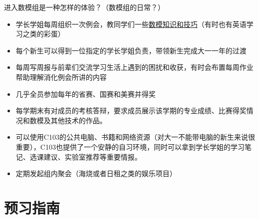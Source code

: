 \documentclass[xcolor={usenames,dvipsnames}]{beamer}
\begin{document}
\begin{frame}
\begin{block}{进入数模组是一种怎样的体验？（数模组的日常？）}
\begin{itemize}
   \item 学长学姐每周组织一次例会，教同学们一些\hyperlink{content}{数模知识和技巧}（有时也有英语学习之类的彩蛋）
   \item 每个新生可以得到一位指定的学长学姐负责，带领新生完成大一一年的过渡
   \item 每周写周报与前辈们交流学习生活上遇到的困扰和收获，有时会布置每周作业帮助理解消化例会所讲的内容
   \item 几乎全员参加每年的省赛、国赛和美赛并得奖
   \item 每学期末有对成员的考核答辩，要求成员展示该学期的专业成绩、比赛得奖情况和数模及其他技术的作品。
   \item 可以使用C103的公共电脑、书籍和网络资源（对大一不能带电脑的新生来说很重要），C103也提供了一个安静的自习环境，同时可以拿到学长学姐的学习笔记、选课建议、实验室推荐等重要情报。
   \item 定期发起组内聚会（海烧或者日租之类的娱乐项目）
\end{itemize}
\end{block}
\end{frame}

\section{预习指南}\label{sec:preview}
\end{document}
